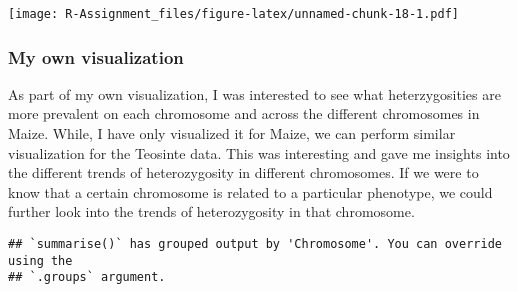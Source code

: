 \documentclass[
]{article}
\newenvironment{Shaded}{\begin{snugshade}}{\end{snugshade}}
\newcommand{\AttributeTok}[1]{\textcolor[rgb]{0.13,0.29,0.53}{#1}}
\newcommand{\CommentTok}[1]{\textcolor[rgb]{0.56,0.35,0.01}{\textit{#1}}}
\newcommand{\FunctionTok}[1]{\textcolor[rgb]{0.13,0.29,0.53}{\textbf{#1}}}
\newcommand{\NormalTok}[1]{#1}
\newcommand{\OtherTok}[1]{\textcolor[rgb]{0.56,0.35,0.01}{#1}}
\newcommand{\SpecialCharTok}[1]{\textcolor[rgb]{0.81,0.36,0.00}{\textbf{#1}}}
\newcommand{\StringTok}[1]{\textcolor[rgb]{0.31,0.60,0.02}{#1}}
\begin{document}
\texttt{[image: R-Assignment\_files/figure-latex/unnamed-chunk-18-1.pdf]}

\subsubsection{My own visualization}\label{my-own-visualization}

As part of my own visualization, I was interested to see what
heterzygosities are more prevalent on each chromosome and across the
different chromosomes in Maize. While, I have only visualized it for
Maize, we can perform similar visualization for the Teosinte data. This
was interesting and gave me insights into the different trends of
heterozygosity in different chromosomes. If we were to know that a
certain chromosome is related to a particular phenotype, we could
further look into the trends of heterozygosity in that chromosome.

\begin{Shaded}
\end{Shaded}

\begin{verbatim}
## `summarise()` has grouped output by 'Chromosome'. You can override using the
## `.groups` argument.
\end{verbatim}
\end{document}
